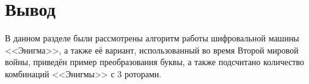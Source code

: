 %

%
%
%
%
%
%

\section*{Вывод}

В данном разделе были рассмотрены алгоритм работы шифровальной машины <<Энигма>>, а также её вариант, использованный во время Второй мировой войны, приведён пример преобразования буквы, а также подсчитано количество комбинаций <<Энигмы>> с 3 роторами.

